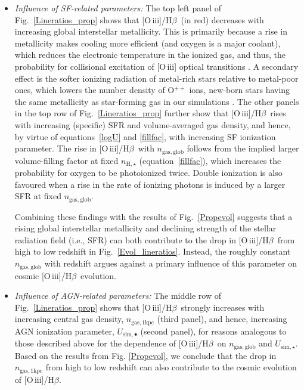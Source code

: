 \documentclass[fleqn,usenatbib]{mnras}
\newcommand{\oiiihb}{\hbox{[O\,{\sc iii}]/H$\beta$}}
\begin{document}
\begin{itemize}

\item{\it Influence of SF-related parameters:}
%
The top left panel of Fig.~\ref{Lineratios_prop} shows that \oiiihb\
(in red)  decreases with increasing global interstellar
metallicity. This is primarily because  a rise in metallicity makes
cooling more efficient (and oxygen is a major coolant),  which reduces
the electronic temperature in the ionized gas, and thus,  the
probability for collisional excitation of [O\,{\sc iii}] optical
transitions  \citep[e.g.,][]{Stasinska80,Gutkin16}. A secondary effect
is the softer ionizing radiation of metal-rich stars relative to
metal-poor ones, which  lowers the number density of O$^{++}$ ions,
new-born  stars having the same metallicity as star-forming gas in our
simulations  \citep[Section~\ref{emlines_sf}; see,
e.g.,][]{Gutkin16}. The other panels in the top row of
Fig.~\ref{Lineratios_prop} further show that \oiiihb\ rises with
increasing (specific) SFR and volume-averaged gas density, and hence,
by virtue of equations~\eqref{logU} and \eqref{fillfac}, with
increasing SF  ionization parameter. The rise in \oiiihb\ with
 $n_{\mathrm{gas, glob}}$ follows from the implied larger
volume-filling factor at fixed $n_{\mathrm{H},\star}$
(equation~\ref{fillfac}), which increases the probability for oxygen
to be photoionized twice. Double ionization is also favoured when a
rise in the rate of ionizing photons is induced by a larger SFR at
fixed $n_{\mathrm{gas, glob}}$. 

Combining these findings with the results of Fig.~\ref{Propevol}
suggests that  a rising global interstellar metallicity and declining
strength of the stellar radiation field  (i.e., SFR) can both
contribute to the drop in \oiiihb\ from high to low redshift in
Fig.~\ref{Evol_lineratios}.  Instead, the roughly constant
 $n_{\mathrm{gas, glob}}$  with redshift argues against a primary
influence of this parameter on cosmic \oiiihb\  evolution.


\item{\it Influence of AGN-related parameters:}
The middle row of Fig.~\ref{Lineratios_prop} shows that \oiiihb\
strongly increases with increasing central gas density,
$n_{\mathrm{gas, 1kpc}}$ (third panel),  and hence, increasing AGN
ionization parameter, $U_{\mathrm{sim,\bullet}}$ (second panel), for
reasons analogous to those described above for the dependence of
\oiiihb\  on  $n_{\mathrm{gas, glob}}$ and
$U_{\mathrm{sim,\star}}$. Based on the results  from
Fig. \ref{Propevol}, we conclude that the drop in $n_{\mathrm{gas,
    1kpc}}$  from high to low redshift can also contribute to the
cosmic evolution of \oiiihb.   


\end{itemize}
\end{document}
